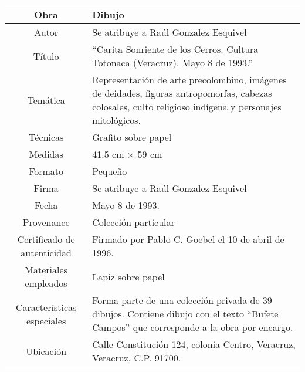 \begin{table}[H]
\centering
\begin{tabular}{|c|m{}|}
\hline
Obra& Dibujo	\\
\hline
Autor & Se atribuye a Ra\'ul Gonzalez Esquivel\\
\hline
T\'itulo & ``Carita Sonriente de los Cerros. Cultura Totonaca (Veracruz). Mayo 8 de 1993.''\\
\hline
Tem\'atica & Representaci\'on de arte precolombino, im\'agenes de deidades, figuras antropomorfas, cabezas colosales, culto religioso ind\'igena y personajes mitol\'ogicos.\\
\hline
T\'ecnicas &Grafito sobre papel \\
\hline
Medidas & 41.5 cm $\times$ 59 cm \\
\hline
 Formato & Peque\~no \\
 \hline
 Firma & Se atribuye a Ra\'ul Gonzalez Esquivel\\ 
 \hline
  Fecha & Mayo 8 de 1993.\\
 \hline
 Provenance & Colecci\'on particular\\
 \hline
 Certificado de autenticidad& Firmado por Pablo C. Goebel el 10 de abril de 1996.  \\
 \hline 
  Materiales empleados & Lapiz sobre papel\\
 \hline
 Caracter\'isticas especiales & Forma parte de una colecci\'on privada de 39 dibujos. 
Contiene dibujo con el texto ``Bufete Campos'' que corresponde a la obra por encargo. \\
\hline 
Ubicaci\'on & Calle Constituci\'on 124, colonia Centro, Veracruz, Veracruz, C.P. 91700.\\
\hline

\end{tabular}
\end{table}

